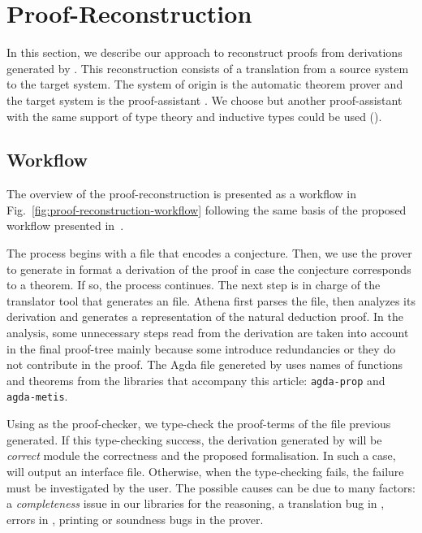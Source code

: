 \documentclass[../main.tex]{subfiles}
\begin{document}

\section{Proof-Reconstruction}
\label{sec:proof-reconstruction}

In this section, we describe our approach to reconstruct proofs from
\CPL derivations generated by \Metis. This reconstruction consists of
a translation from a source system to the target system. The system of
origin is the automatic theorem prover \Metis and the target system is
the proof-assistant \Agda. We choose \Agda but another proof-assistant
with the same support of type theory and inductive types could be used
(\eg \Coq).

\subsection{Workflow}
\label{ssec:workflow}


The overview of the proof-reconstruction is presented as a workflow
in Fig.~\ref{fig:proof-reconstruction-workflow} following the same
basis of the proposed workflow presented in~\cite{sultana2015}.

The process begins with a \TPTP file that encodes a \CPL conjecture.
Then, we use the \Metis prover to generate in \TSTP format a derivation
of the proof in case the \CPL conjecture corresponds to a theorem.
If so, the process continues. The next step is in charge of the
\Athena translator tool that generates an \Agda file.
Athena first parses the \TSTP file, then analyzes its
derivation and generates a representation of the natural deduction
proof. In the analysis, some unnecessary steps read from the \TSTP derivation
are taken into account in the final proof-tree mainly because some introduce redundancies
or they do not contribute in the proof.
The Agda file genereted by \Athena uses names of functions
and theorems from the \Agda libraries that accompany this article:
\texttt{agda-prop} and \texttt{agda-metis}.

Using \Agda as the proof-checker, we type-check the proof-terms of the
\Agda file previous generated. If this type-checking success, the
\TSTP derivation generated by \Metis will be \emph{correct} module the
\Agda correctness and the proposed formalisation.
In such a case, \Agda will output an interface file. Otherwise, when
the type-checking fails, the failure must be investigated by the user.
The possible causes can be due to many factors: a
\emph{completeness} issue in our \Agda libraries for the \Metis
reasoning, a translation bug in \Athena, errors in \Agda, printing or
soundness bugs in the \Metis prover.
\end{document}
